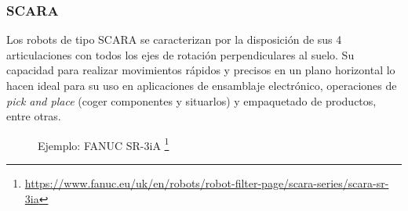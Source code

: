\subsubsection{SCARA}
Los robots de tipo \acs{SCARA} se caracterizan por la disposición de sus 4 articulaciones con todos los ejes de rotación perpendiculares al suelo. Su capacidad para 
realizar movimientos rápidos y precisos en un plano horizontal lo hacen ideal para su uso en aplicaciones de ensamblaje electrónico, operaciones de 
\textit{pick and place} (coger componentes y situarlos) y empaquetado de productos, entre otras.
\begin{figure} [h!]
  \centering    
  \hspace{3cm}
  \caption[Fanuc SR-3iA]{Ejemplo: FANUC SR-3iA \footnote{\url{https://www.fanuc.eu/uk/en/robots/robot-filter-page/scara-series/scara-sr-3ia}}}
\end{figure}
\newpage
